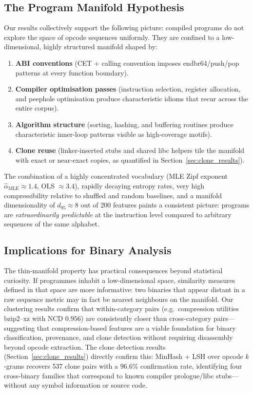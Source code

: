 \documentclass[10pt,twocolumn]{article}
\begin{document}
\subsection{The Program Manifold Hypothesis}

Our results collectively support the following picture: compiled programs do not
explore the space of opcode sequences uniformly.  They are confined to a
low-dimensional, highly structured manifold shaped by:
\begin{enumerate}
  \item \textbf{ABI conventions} (CET + calling convention imposes endbr64/push/pop
        patterns at every function boundary).
  \item \textbf{Compiler optimisation passes} (instruction selection, register
        allocation, and peephole optimisation produce characteristic idioms that
        recur across the entire corpus).
  \item \textbf{Algorithm structure} (sorting, hashing, and buffering routines
        produce characteristic inner-loop patterns visible as high-coverage motifs).
  \item \textbf{Clone reuse} (linker-inserted stubs and shared libc helpers
        tile the manifold with exact or near-exact copies, as quantified in
        Section~\ref{sec:clone_results}).
\end{enumerate}

The combination of a highly concentrated vocabulary (MLE Zipf exponent
$\hat{\alpha}_{\text{MLE}} \approx 1.4$, OLS $\approx 3.4$), rapidly
decaying entropy rates, very high compressibility relative to shuffled and random baselines, and a manifold
dimensionality of $d_{95} \approx 8$ out of 200 features paints a consistent
picture: programs are \emph{extraordinarily predictable} at the instruction
level compared to arbitrary sequences of the same alphabet.

\subsection{Implications for Binary Analysis}

The thin-manifold property has practical consequences beyond statistical
curiosity.  If programmes inhabit a low-dimensional space, similarity measures
defined in that space are more informative: two binaries that appear distant in
a raw sequence metric may in fact be nearest neighbours on the manifold.  Our
clustering results confirm that within-category pairs (e.g.\ compression
utilities bzip2--xz with NCD $0.956$) are consistently closer than cross-category
pairs---suggesting that compression-based features are a viable foundation for
binary classification, provenance, and clone detection without requiring
disassembly beyond opcode extraction.  The clone detection results
(Section~\ref{sec:clone_results}) directly confirm this: MinHash + LSH over
opcode $k$-grams recovers 537 clone pairs with a $96.6\%$ confirmation rate,
identifying four cross-binary families that correspond to known compiler
prologue/libc stubs---without any symbol information or source code.
\end{document}
